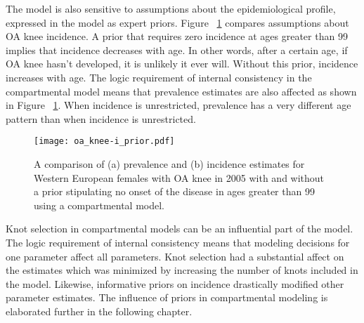 The model is also sensitive to assumptions about the epidemiological
profile, expressed in the model as expert priors.  Figure
~\ref{fig:app-oa knee priors} compares assumptions about OA knee
incidence.  A prior that requires zero incidence at ages greater than
99 implies that incidence decreases with age.  In other words, after a
certain age, if OA knee hasn't developed, it is unlikely it ever
will. Without this prior, incidence increases with age.  The logic
requirement of internal consistency in the compartmental model means
that prevalence estimates are also affected as shown in Figure
~\ref{fig:app-oa knee priors}.  When incidence is unrestricted,
prevalence has a very different age pattern than when incidence is
unrestricted.

    \begin{figure}[h]
        \begin{center}
            \texttt{[image: oa\_knee-i\_prior.pdf]}
            \caption{A comparison of (a) prevalence and (b) incidence estimates
              for Western European females
              with OA knee in 2005 with and
              without a prior stipulating no onset of the disease in
              ages greater than 99 using a compartmental model.}
            \label{fig:app-oa knee priors}
        \end{center}
    \end{figure}

Knot selection in compartmental models can be an influential part of the
model.  The logic requirement of internal consistency means that modeling
decisions for one parameter affect all parameters.  Knot selection had a
substantial affect on the estimates which was minimized by increasing the
number of knots included in the model.  Likewise, informative priors on
incidence drastically modified other parameter estimates.  The influence
of priors in compartmental modeling is elaborated further in the following chapter.
